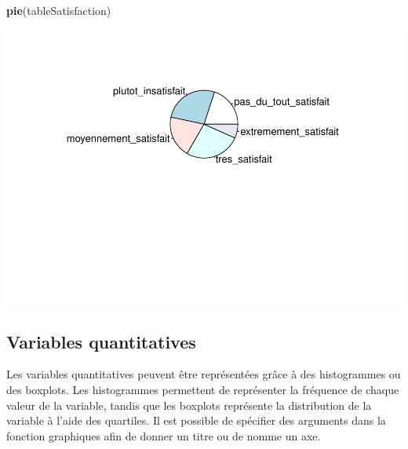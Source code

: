 \documentclass[
]{book}
\newenvironment{Shaded}{\begin{snugshade}}{\end{snugshade}}
\newcommand{\AttributeTok}[1]{\textcolor[rgb]{0.13,0.29,0.53}{#1}}
\newcommand{\FunctionTok}[1]{\textcolor[rgb]{0.13,0.29,0.53}{\textbf{#1}}}
\newcommand{\NormalTok}[1]{#1}
\newcommand{\SpecialCharTok}[1]{\textcolor[rgb]{0.81,0.36,0.00}{\textbf{#1}}}
\newcommand{\StringTok}[1]{\textcolor[rgb]{0.31,0.60,0.02}{#1}}
\begin{document}
\begin{Shaded}
\begin{Highlighting}[]
\FunctionTok{pie}\NormalTok{(tableSatisfaction)}
\end{Highlighting}
\end{Shaded}

\includegraphics{_main_files/figure-latex/unnamed-chunk-51-4.pdf}

\subsection{Variables quantitatives}\label{variables-quantitatives-1}

Les variables quantitatives peuvent être représentées grâce à des histogrammes ou des boxplots. Les histogrammes permettent de représenter la fréquence de chaque valeur de la variable, tandis que les boxplots représente la distribution de la variable à l'aide des quartiles. Il est possible de spécifier des arguments dans la fonction graphiques afin de donner un titre ou de nomme un axe.

\begin{Shaded}
\end{Shaded}
\end{document}
